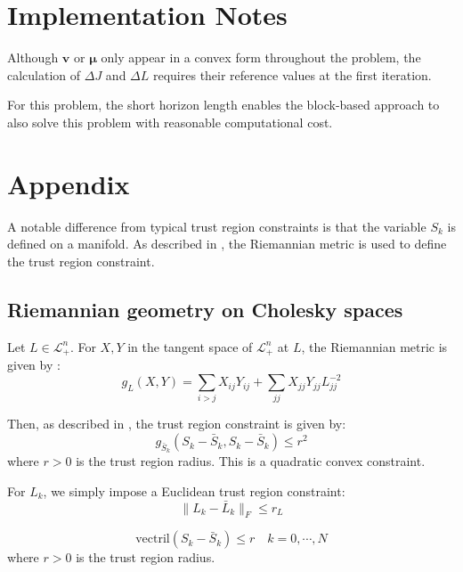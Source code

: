 \documentclass{article}
\begin{document}
\section{Implementation Notes}
Although $\bm{v}$ or $\bm{\mu}$ only appear in a convex form throughout the problem, the calculation of $\Delta J$ and $\Delta L$ requires their reference values at the first iteration.

For this problem, the short horizon length enables the block-based approach to also solve this problem with reasonable computational cost.

\section{Appendix}

A notable difference from typical trust region constraints is that the variable \( S_k \) is defined on a manifold. As described in \cite{kraislerIntrinsicSuccessiveConvexification2025a}, the Riemannian metric is used to define the trust region constraint. 

\subsection{Riemannian geometry on Cholesky spaces}
Let \( L \in \mathcal{L}_+^n \).
For \( X, Y \) in the tangent space of \( \mathcal{L}_+^n \) at \( L \), the Riemannian metric is given by \cite{linRiemannianGeometrySymmetric2019}:
\begin{equation}
	g_L(X,Y)
 = \sum_{i>j} X_{ij} Y_{ij} + \sum_{jj} X_{jj} Y_{jj} L_{jj}^{-2}
 \end{equation}

 Then, as described in \cite{kraislerIntrinsicSuccessiveConvexification2025a}, the trust region constraint is given by:
 \begin{equation} \label{eq:trust_region_constraint}
 	g_{\bar{S}_k}(S_k - \bar{S}_k, S_k - \bar{S}_k) \leq r^2
 \end{equation}
 where \( r > 0 \) is the trust region radius. This is a quadratic convex constraint.

 For \(L_k\), we simply impose a Euclidean trust region constraint:
 \begin{equation} \label{eq:trust_region_constraint_L}
 	\|L_k - \bar{L}_k\|_F \leq r_L
 \end{equation}

\begin{equation} \label{eq:trust_region_constraint_vectril}
	\mathrm{vectril}(S_k - \bar{S}_k) \leq r \quad k=0,\cdots, N
\end{equation}
where \( r > 0 \) is the trust region radius. 
\end{document}
